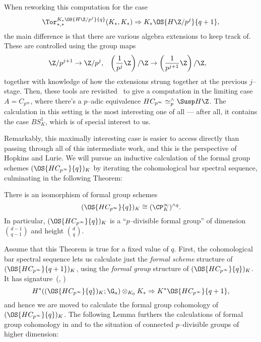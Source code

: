 \begin{remark}
When reworking this computation for the case \[\Tor^{K_* \OS{H\Z/p^j}{q}}_{*, *}(K_*, K_*) \Rightarrow K_* \OS{H\Z/p^j}{q+1},\] the main difference is that there are various algebra extensions to keep track of.  These are controlled using the group maps
\begin{align*}
\Z/p^{j+1} & \to \Z/p^j, &
\left(\frac{1}{p^j}\Z\right)/\Z & \to \left(\frac{1}{p^{j+1}} \Z\right) / \Z,
\end{align*}
together with knowledge of how the extensions strung together at the previous $j$--stage.  Then, these tools are revisited~\cite[Theorem 12.4]{RavenelWilsonKthyOfEMSpaces} to give a computation in the limiting case $A = C_{p^\infty}$, where there's a $p$--adic equivalence $HC_{p^\infty} \simeq^\wedge_p \Susp H\Z$.  The calculation in this setting is the most interesting one of all --- after all, it contains the case $BS^1_K$, which is of special interest to us.
\end{remark}

Remarkably, this maximally interesting case is easier to access directly than passing through all of this intermediate work, and this is the perspective of Hopkins and Lurie.  We will pursue an inductive calculation of the formal group schemes $(\OS{HC_{p^\infty}}{q})_K$ by iterating the cohomological bar spectral sequence, culminating in the following Theorem:
\begin{theorem}
There is an isomorphism of formal group schemes \[(\OS{HC_{p^\infty}}{q})_K \cong (\CP^\infty_K)^{\wedge q}.\]  In particular, $(\OS{HC_{p^\infty}}{q})_K$ is a ``$p$--divisible formal group'' of dimension $\binom{d-1}{q-1}$ and height $\binom{d}{q}$.
\end{theorem}

\noindent Assume that this Theorem is true for a fixed value of $q$.  First, the cohomological bar spectral sequence lets us calculate just the \emph{formal scheme} structure of $(\OS{HC_{p^\infty}}{q+1})_K$, using the \emph{formal group} structure of $(\OS{HC_{p^\infty}}{q})_K$.  It has signature~(\cite{LazarevDeformations}, \cite[Example 2.3.5]{HopkinsLurie}) \[H^*((\OS{HC_{p^\infty}}{q})_K; \G_a) \otimes_{K_0} K_* \Rightarrow K^* \OS{HC_{p^\infty}}{q+1},\] and hence we are moved to calculate the formal group cohomology of $(\OS{HC_{p^\infty}}{q})_K$.   The following Lemma furthers the calculations of formal group cohomology in  and  to the situation of connected $p$--divisible groups of higher dimension:

